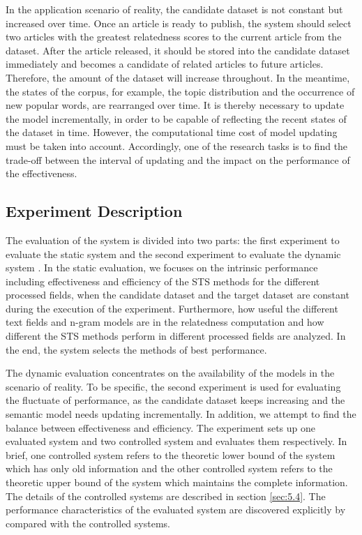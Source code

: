 In the application scenario of reality, the candidate dataset is not constant but increased over time. Once an article is ready to publish, the system should select two articles with the greatest relatedness scores to the current article from the dataset. After the article released, it should be stored into the candidate dataset immediately and becomes a candidate of related articles to future articles. Therefore, the amount of the dataset will increase throughout. In the meantime, the states of the corpus, for example, the topic distribution and the occurrence of new popular words, are rearranged over time. It is thereby necessary to update the model incrementally, in order to be capable of reflecting the recent states of the dataset in time. However, the computational time cost of model updating must be taken into account. Accordingly, one of the research tasks is to find the trade-off between the interval of updating and the impact on the performance of the effectiveness.  

\bigbreak

\subsection{Experiment Description}
\label{sec:4.4}

The evaluation of the system is divided into two parts: the first experiment to evaluate the static system and the second experiment to evaluate the dynamic system . In the static evaluation, we focuses on the intrinsic performance including effectiveness and efficiency of the STS methods for the different processed fields, when the candidate dataset and the target dataset are constant during the execution of the experiment. Furthermore, how useful the different text fields and n-gram models are in the relatedness computation and how different the STS methods perform in different processed fields are analyzed. In the end, the system selects the methods of best performance. 

The dynamic evaluation concentrates on the availability of the models in the scenario of reality. To be specific, the second experiment is used for evaluating the fluctuate of performance, as the candidate dataset keeps increasing and the semantic model needs updating incrementally. In addition, we attempt to find the balance between effectiveness and efficiency. The experiment sets up one evaluated system and two controlled system and evaluates them respectively. In brief, one controlled system refers to the theoretic lower bound of the system which has only old information and the other controlled system refers to the theoretic upper bound of the system which maintains the complete information. The details of the controlled systems are described in section \ref{sec:5.4}. The performance characteristics of the evaluated system are discovered explicitly by compared with the controlled systems. 

